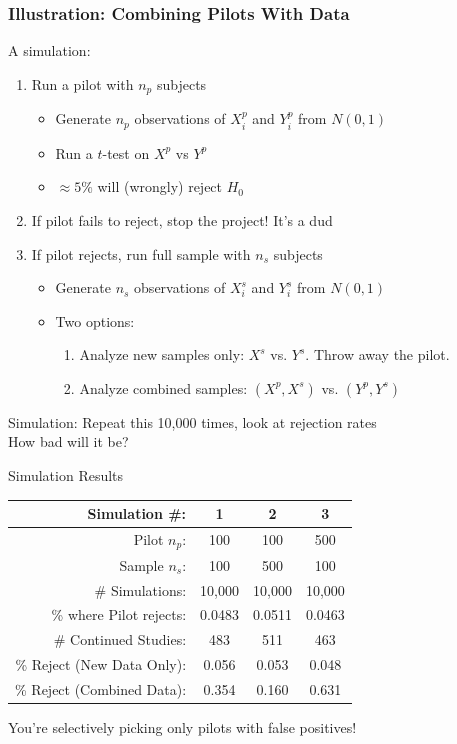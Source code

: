 \begin{frame}
\frametitle{Illustration: Combining Pilots With Data}
A simulation:
\begin{enumerate}
    \item Run a pilot with $n_p$ subjects
    \begin{itemize}
        \item Generate $n_p$ observations of $X_i^p$ and $Y_i^p$ from $N(0,1)$
        \item Run a $t$-test on $X^p$ vs $Y^p$
        \item $\approx 5\%$ will (wrongly) reject $H_0$
    \end{itemize}
    \item[2a.] If pilot fails to reject, stop the project! It's a dud
    \item[2b.] If pilot rejects, run full sample with $n_s$ subjects
    \setcounter{enumi}{2}
    \begin{itemize}
        \item Generate $n_s$ observations of $X_i^s$ and $Y_i^s$ from $N(0,1)$
        \item Two options:
        \begin{enumerate}
            \item[Ethical:] Analyze new samples only: $X^s$ vs. $Y^s$. Throw away the pilot.
            \item[Unethical:] Analyze combined samples: $(X^p,X^s)$ vs. $(Y^p,Y^s)$
        \end{enumerate}
    \end{itemize}
\end{enumerate}
Simulation: Repeat this 10,000 times, look at rejection rates\\
How bad will it be?
\end{frame}

\begin{frame}{Simulation Results}
\begin{center}
    \begin{tabular}{|r|c|c|c|}
    \hline
    Simulation \#: & 1 & 2 & 3 \\
    \hline
      Pilot $n_p$: & 100 & 100 & 500\\
    \hline
      Sample $n_s$: & 100 & 500 & 100\\
    \hline
    \hline
    \# Simulations: & 10,000 & 10,000 & 10,000 \\
    \hline
    \% where Pilot rejects: & 0.0483 & 0.0511 & 0.0463\\
    \hline
    \# Continued Studies: & 483 & 511 & 463 \\
    \hline
    \% Reject (New Data Only): & 0.056 & 0.053 & 0.048 \\
    \hline
    \% Reject (Combined Data): & {\color{red}0.354} & {\color{red}0.160} & {\color{red}0.631} \\
    \hline
    \end{tabular}
\end{center}
You're selectively picking only pilots with false positives!
\end{frame}


